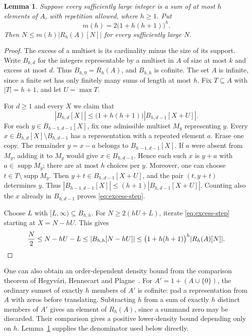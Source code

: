 \documentclass[11pt,reqno]{amsart}
\newtheorem{lemma}[theorem]{Lemma}
\theoremstyle{definition}
\theoremstyle{remark}
\begin{document}
\begin{lemma}\label{lem:collision-density}
Suppose every sufficiently large integer is a sum of at most \(h\)
elements of \(A\), with repetition allowed, where \(h\ge1\). Put
\[
  m(h)=2\bigl(1+h(h+1)\bigr)^h.
\]
Then \(N\le m(h)|R_h(A)[N]|\) for every sufficiently large \(N\).
\end{lemma}

\begin{proof}
The excess of a multiset is its cardinality minus the size of its support.
Write \(B_{k,d}\) for the integers representable by a multiset in \(A\)
of size at most \(k\) and excess at most \(d\). Thus
\(B_{h,0}=R_h(A)\), and \(B_{h,h}\) is cofinite.
The set \(A\) is infinite, since a finite set has only finitely many sums
of length at most \(h\). Fix \(T\subseteq A\) with \(|T|=h+1\),
and let \(U=\max T\).

For \(d\ge1\) and every \(X\) we claim that
\begin{equation}\label{eq:excess-step}
  |B_{h,d}[X]|\le \bigl(1+h(h+1)\bigr)|B_{h,d-1}[X+U]|.
\end{equation}
For each \(y\in B_{h-1,d-1}[X]\), fix one admissible multiset \(M_y\)
representing \(y\). Every \(x\in B_{h,d}[X]\setminus B_{h,d-1}\)
has a representation with a repeated element \(a\). Erase one copy.
The remainder \(y=x-a\) belongs to \(B_{h-1,d-1}[X]\).
If \(a\) were absent from \(M_y\), adding it to \(M_y\) would give
\(x\in B_{h,d-1}\). Hence each such \(x\) is \(y+a\) with
\(a\in\operatorname{supp}M_y\); there are at most \(h\) choices per \(y\).
Moreover, one can choose \(t\in T\setminus\operatorname{supp}M_y\).
Then \(y+t\in B_{h,d-1}[X+U]\), and the pair \((t,y+t)\) determines
\(y\). Thus \(|B_{h-1,d-1}[X]|\le(h+1)|B_{h,d-1}[X+U]|\).
Counting also the \(x\) already in \(B_{h,d-1}\) proves
\eqref{eq:excess-step}.

Choose \(L\) with \([L,\infty)\subseteq B_{h,h}\). For
\(N\ge2(hU+L)\), iterate \eqref{eq:excess-step} starting at \(X=N-hU\).
This gives
\[
  \frac N2\le N-hU-L\le |B_{h,h}[N-hU]|
      \le \bigl(1+h(h+1)\bigr)^h |R_h(A)[N]|.
  \qedhere
\]
\end{proof}

One can also obtain an order-dependent density bound from the comparison
theorem of Hegyv\'ari, Hennecart and Plagne~\cite{HHP03,Heg17}.
For \(A'=1+(A\cup\{0\})\), the ordinary sumset of exactly \(h\) members
of \(A'\) is cofinite: pad a representation from \(A\) with zeros
before translating. Subtracting \(h\) from a sum of exactly \(h\)
distinct members of \(A'\) gives an element of \(R_h(A)\), since a
summand zero may be discarded. Their comparison gives a positive
lower-density bound depending only on \(h\). Lemma~\ref{lem:collision-density}
supplies the denominator used below directly.
\end{document}

